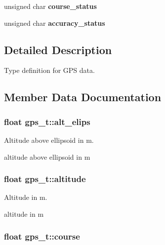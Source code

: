 \begin{DoxyCompactItemize}
\item 
\hypertarget{structgps__t_a6ad792f9f2c8d32cc0b72dfa18d7b835}{unsigned char {\bfseries course\+\_\+status}}\label{structgps__t_a6ad792f9f2c8d32cc0b72dfa18d7b835}

\item 
\hypertarget{structgps__t_a1de0b0fb9f2b052f8e5ab70f19f0c847}{unsigned char {\bfseries accuracy\+\_\+status}}\label{structgps__t_a1de0b0fb9f2b052f8e5ab70f19f0c847}

\end{DoxyCompactItemize}


\subsection{Detailed Description}
Type definition for G\+P\+S data. 

\subsection{Member Data Documentation}
\hypertarget{structgps__t_a7ce84b87b2d3cbc7d6458e3734cc78e6}{
\subsubsection[{alt\+\_\+elips}]{\setlength{\rightskip}{0pt plus 5cm}float gps\+\_\+t\+::alt\+\_\+elips}}\label{structgps__t_a7ce84b87b2d3cbc7d6458e3734cc78e6}


Altitude above ellipsoid in m. 

altitude above ellipsoid in m \hypertarget{structgps__t_a72edc614dd84ab0d29c6720d15d79e8e}{
\subsubsection[{altitude}]{\setlength{\rightskip}{0pt plus 5cm}float gps\+\_\+t\+::altitude}}\label{structgps__t_a72edc614dd84ab0d29c6720d15d79e8e}


Altitude in m. 

altitude in m \hypertarget{structgps__t_a7d2135669d6fc88c68dbe3459d505a7a}{
\subsubsection[{course}]{\setlength{\rightskip}{0pt plus 5cm}float gps\+\_\+t\+::course}}\label{structgps__t_a7d2135669d6fc88c68dbe3459d505a7a}


